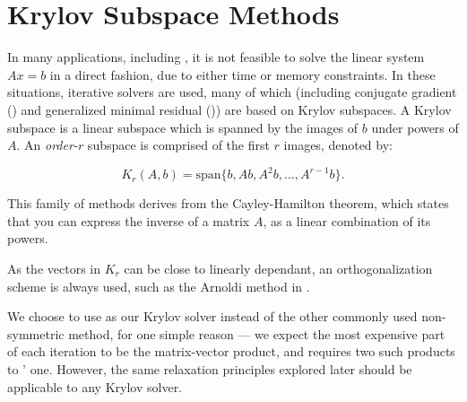 %	
%
%	
%	

\section{Krylov Subspace Methods}\label{sec:krylov}

In many applications, including {\bem}, it is not feasible to solve the linear system $Ax = b$ in a direct fashion, due to either time or memory constraints. In these situations, iterative solvers are used, many of which (including conjugate gradient ({\cg}) and generalized minimal residual ({\gmres})) are based on Krylov subspaces. A Krylov subspace is a linear subspace which is spanned by the images of $b$ under powers of $A$. An \emph{order-$r$} subspace is comprised of the first $r$ images, denoted by:

\begin{equation}
	K_{r}(A,b) = \text{span}\{ b, Ab, A^{2}b, ..., A^{r-1}b\}.
\end{equation}

This family of methods derives from the Cayley-Hamilton theorem, which states that you can express the inverse of a  matrix $A$, as a linear combination of its powers. %

As the vectors in $K_{r}$ can be close to linearly dependant, an orthogonalization scheme is always used, such as the Arnoldi method in {\gmres}\cite{SaadSchultz1986}.

We choose to use {\gmres} as our Krylov solver instead of the other commonly used non-symmetric method, {\bicgstab} for one simple reason --- we expect the most expensive part of each iteration to be the matrix-vector product, and {\bicgstab} requires two such products to {\gmres}' one. However, the same relaxation principles explored later should be applicable to any Krylov solver.

